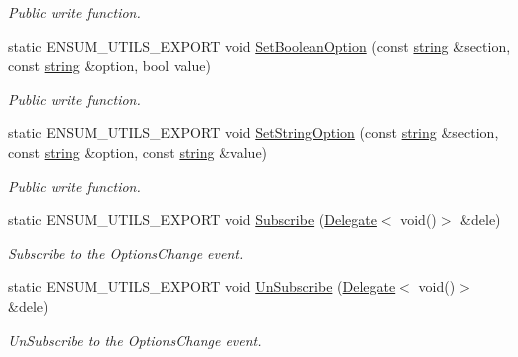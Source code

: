 \begin{DoxyCompactItemize}
\begin{DoxyCompactList}\small\item\em Public write function. \end{DoxyCompactList}\item 
static E\+N\+S\+U\+M\+\_\+\+U\+T\+I\+L\+S\+\_\+\+E\+X\+P\+O\+RT void \hyperlink{class_ensum_1_1_utils_1_1_options_a68837babb89a589bc49180fd849b2c28}{Set\+Boolean\+Option} (const \hyperlink{class_ensum_1_1string}{string} \&section, const \hyperlink{class_ensum_1_1string}{string} \&option, bool value)\hypertarget{class_ensum_1_1_utils_1_1_options_a68837babb89a589bc49180fd849b2c28}{}\label{class_ensum_1_1_utils_1_1_options_a68837babb89a589bc49180fd849b2c28}

\begin{DoxyCompactList}\small\item\em Public write function. \end{DoxyCompactList}\item 
static E\+N\+S\+U\+M\+\_\+\+U\+T\+I\+L\+S\+\_\+\+E\+X\+P\+O\+RT void \hyperlink{class_ensum_1_1_utils_1_1_options_a67df741524fdcd73f377d3b65f9699c9}{Set\+String\+Option} (const \hyperlink{class_ensum_1_1string}{string} \&section, const \hyperlink{class_ensum_1_1string}{string} \&option, const \hyperlink{class_ensum_1_1string}{string} \&value)\hypertarget{class_ensum_1_1_utils_1_1_options_a67df741524fdcd73f377d3b65f9699c9}{}\label{class_ensum_1_1_utils_1_1_options_a67df741524fdcd73f377d3b65f9699c9}

\begin{DoxyCompactList}\small\item\em Public write function. \end{DoxyCompactList}\item 
static E\+N\+S\+U\+M\+\_\+\+U\+T\+I\+L\+S\+\_\+\+E\+X\+P\+O\+RT void \hyperlink{class_ensum_1_1_utils_1_1_options_ab567217a53d2ef200574271fa3c957b1}{Subscribe} (\hyperlink{class_ensum_1_1_delegate}{Delegate}$<$ void()$>$ \&dele)
\begin{DoxyCompactList}\small\item\em Subscribe to the Options\+Change event. \end{DoxyCompactList}\item 
static E\+N\+S\+U\+M\+\_\+\+U\+T\+I\+L\+S\+\_\+\+E\+X\+P\+O\+RT void \hyperlink{class_ensum_1_1_utils_1_1_options_ac8945e45a27cd51401779bd92ae44fb2}{Un\+Subscribe} (\hyperlink{class_ensum_1_1_delegate}{Delegate}$<$ void()$>$ \&dele)\hypertarget{class_ensum_1_1_utils_1_1_options_ac8945e45a27cd51401779bd92ae44fb2}{}\label{class_ensum_1_1_utils_1_1_options_ac8945e45a27cd51401779bd92ae44fb2}

\begin{DoxyCompactList}\small\item\em Un\+Subscribe to the Options\+Change event. \end{DoxyCompactList}\end{DoxyCompactItemize}

